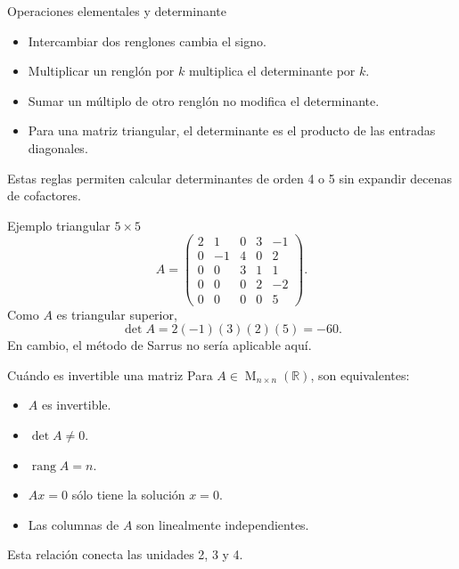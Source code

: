 \documentclass[aspectratio=169,11pt]{beamer}
\newcommand{\R}{\mathbb R}
\newcommand{\M}{\operatorname{M}}
\newcommand{\rang}{\operatorname{rang}}
\begin{document}
\begin{frame}{Operaciones elementales y determinante}
\begin{itemize}\item Intercambiar dos renglones cambia el signo.\item Multiplicar un renglón por $k$ multiplica el determinante por $k$.\item Sumar un múltiplo de otro renglón no modifica el determinante.\item Para una matriz triangular, el determinante es el producto de las entradas diagonales.\end{itemize}
Estas reglas permiten calcular determinantes de orden 4 o 5 sin expandir decenas de cofactores.
\end{frame}
\begin{frame}{Ejemplo triangular $5\times5$}
\scriptsize
\[A=\begin{pmatrix}2&1&0&3&-1\\0&-1&4&0&2\\0&0&3&1&1\\0&0&0&2&-2\\0&0&0&0&5\end{pmatrix}.\]
\normalsize
Como $A$ es triangular superior,
\[\det A=2(-1)(3)(2)(5)=\boxed{-60}.\]
En cambio, el método de Sarrus no sería aplicable aquí.
\end{frame}
\begin{frame}{Cuándo es invertible una matriz}
Para $A\in\M_{n\times n}(\R)$, son equivalentes:
\begin{itemize}\item $A$ es invertible.\item $\det A\neq0$.\item $\rang A=n$.\item $Ax=0$ sólo tiene la solución $x=0$.\item Las columnas de $A$ son linealmente independientes.\end{itemize}
Esta relación conecta las unidades 2, 3 y 4.
\end{frame}
\end{document}
